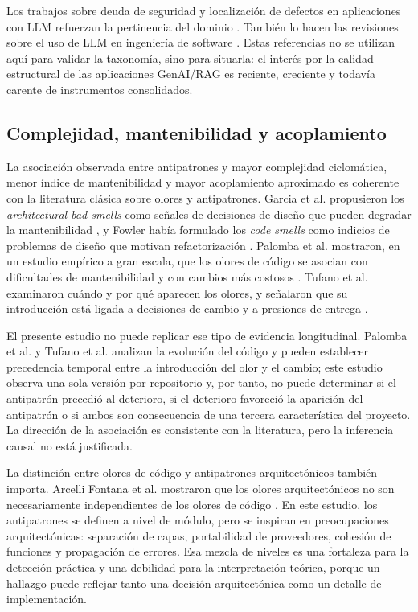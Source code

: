 Los trabajos sobre deuda de seguridad y localización de defectos en aplicaciones con LLM refuerzan la pertinencia del dominio \cite{shen_security_2025,tan_lidl_2026}. También lo hacen las revisiones sobre el uso de LLM en ingeniería de software \cite{hou_large_2024}. Estas referencias no se utilizan aquí para validar la taxonomía, sino para situarla: el interés por la calidad estructural de las aplicaciones GenAI/RAG es reciente, creciente y todavía carente de instrumentos consolidados.

\subsection{Complejidad, mantenibilidad y acoplamiento}

La asociación observada entre antipatrones y mayor complejidad ciclomática, menor índice de mantenibilidad y mayor acoplamiento aproximado es coherente con la literatura clásica sobre olores y antipatrones. Garcia et al. propusieron los \emph{architectural bad smells} como señales de decisiones de diseño que pueden degradar la mantenibilidad \cite{garcia_identifying_2009}, y Fowler había formulado los \emph{code smells} como indicios de problemas de diseño que motivan refactorización \cite{fowler_1999}. Palomba et al. mostraron, en un estudio empírico a gran escala, que los olores de código se asocian con dificultades de mantenibilidad y con cambios más costosos \cite{palomba_diffuseness_2018}. Tufano et al. examinaron cuándo y por qué aparecen los olores, y señalaron que su introducción está ligada a decisiones de cambio y a presiones de entrega \cite{tufano_when_2015}.

El presente estudio no puede replicar ese tipo de evidencia longitudinal. Palomba et al. y Tufano et al. analizan la evolución del código y pueden establecer precedencia temporal entre la introducción del olor y el cambio; este estudio observa una sola versión por repositorio y, por tanto, no puede determinar si el antipatrón precedió al deterioro, si el deterioro favoreció la aparición del antipatrón o si ambos son consecuencia de una tercera característica del proyecto. La dirección de la asociación es consistente con la literatura, pero la inferencia causal no está justificada.

La distinción entre olores de código y antipatrones arquitectónicos también importa. Arcelli Fontana et al. mostraron que los olores arquitectónicos no son necesariamente independientes de los olores de código \cite{arcelli_fontana_are_2019}. En este estudio, los antipatrones se definen a nivel de módulo, pero se inspiran en preocupaciones arquitectónicas: separación de capas, portabilidad de proveedores, cohesión de funciones y propagación de errores. Esa mezcla de niveles es una fortaleza para la detección práctica y una debilidad para la interpretación teórica, porque un hallazgo puede reflejar tanto una decisión arquitectónica como un detalle de implementación.

